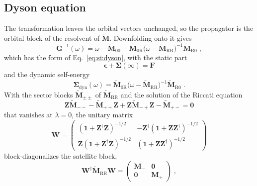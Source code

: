 \documentclass[aip,jcp,reprint,noshowkeys,superscriptaddress]{revtex4-2}
\theoremstyle{plain}
\theoremstyle{definition}
\theoremstyle{remark}
\begin{document}
\subsection{Dyson equation}
The transformation leaves the orbital vectors unchanged, so the propagator is the orbital block of the resolvent of $\tilde{\mathbf{M}}$. Downfolding onto it gives
\begin{equation}
\mathbf{G}^{-1}(\omega)=\omega-\tilde{\mathbf{M}}_{00}-\tilde{\mathbf{M}}_{0\mathrm{R}}\big(\omega-\tilde{\mathbf{M}}_{\mathrm{RR}}\big)^{-1}\tilde{\mathbf{M}}_{\mathrm{R}0} \;,
\label{eq:si:ucc:dyson}
\end{equation}
which has the form of Eq.~\eqref{eq:si:dyson}, with the static part
\begin{equation}
\pmb{\epsilon}+\pmb{\Sigma}(\infty)=\mathbf{F}
\label{eq:si:ucc:static}
\end{equation}
and the dynamic self-energy
\begin{equation}
\pmb{\Sigma}_{\mathrm{dyn}}(\omega)=\tilde{\mathbf{M}}_{0\mathrm{R}}\big(\omega-\tilde{\mathbf{M}}_{\mathrm{RR}}\big)^{-1}\tilde{\mathbf{M}}_{\mathrm{R}0} \;.
\label{eq:si:ucc:sigma}
\end{equation}
With the sector blocks $\tilde{\mathbf{M}}_{\pm\pm}$ of $\tilde{\mathbf{M}}_{\mathrm{RR}}$ and the solution of the Riccati equation
\begin{equation}
\mathbf{Z}\tilde{\mathbf{M}}_{--}-\tilde{\mathbf{M}}_{++}\mathbf{Z}+\mathbf{Z}\tilde{\mathbf{M}}_{-+}\mathbf{Z}-\tilde{\mathbf{M}}_{+-}=\mathbf{0}
\label{eq:si:ucc:riccati}
\end{equation}
that vanishes at $\lambda=0$, the unitary matrix
\begin{equation}
\mathbf{W}=\begin{pmatrix}(\mathbf{1}+\mathbf{Z}^\dagger\mathbf{Z})^{-1/2} & -\mathbf{Z}^\dagger(\mathbf{1}+\mathbf{Z}\mathbf{Z}^\dagger)^{-1/2}\\ \mathbf{Z}(\mathbf{1}+\mathbf{Z}^\dagger\mathbf{Z})^{-1/2} & (\mathbf{1}+\mathbf{Z}\mathbf{Z}^\dagger)^{-1/2}\end{pmatrix}
\label{eq:si:ucc:W}
\end{equation}
block-diagonalizes the satellite block,
\begin{equation}
\mathbf{W}^\dagger\tilde{\mathbf{M}}_{\mathrm{RR}}\mathbf{W}=\begin{pmatrix}\mathbf{M}_{-} & \mathbf{0}\\ \mathbf{0} & \mathbf{M}_{+}\end{pmatrix}\;,
\label{eq:si:ucc:Mdec}
\end{equation}
\end{document}
